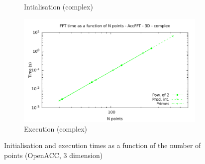\documentclass[12pt, a4paper]{article}
\begin{document}
\begin{figure}[H]
\begin{subfigure}{.5\textwidth}
\caption{Intialisation (complex)}
\label{FFTACC3DCI}
\end{subfigure}%
\begin{subfigure}{.5\textwidth}
\centering
\includegraphics[width=.9\linewidth]{graphs/fft-openacc-3d-pow2-c-exec.pdf}
\caption{Execution (complex)}
\label{FFTACC3DCE}
\end{subfigure}
\caption{Initialisation and execution times as a function of the number of points (OpenACC, 3 dimension)}
\label{FFTCL3D}
\end{figure}
\end{document}
